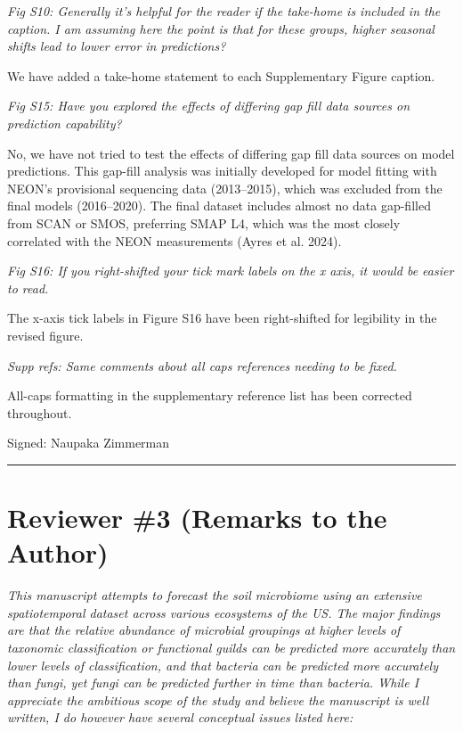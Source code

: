 \documentclass[11pt]{article}
\begin{document}
\bigskip

\textit{Fig S10: Generally it's helpful for the reader if the take-home is included in the caption. I am assuming here the point is that for these groups, higher seasonal shifts lead to lower error in predictions?}

We have added a take-home statement to each Supplementary Figure caption.

\bigskip

\textit{Fig S15: Have you explored the effects of differing gap fill data sources on prediction capability?}

No, we have not tried to test the effects of differing gap fill data sources on model predictions. This gap-fill analysis was initially developed for model fitting with NEON's provisional sequencing data (2013--2015), which was excluded from the final models (2016--2020). The final dataset includes almost no data gap-filled from SCAN or SMOS, preferring SMAP L4, which was the most closely correlated with the NEON measurements (Ayres et al. 2024).

\bigskip

\textit{Fig S16: If you right-shifted your tick mark labels on the x axis, it would be easier to read.}

The x-axis tick labels in Figure S16 have been right-shifted for legibility in the revised figure.

\bigskip

\textit{Supp refs: Same comments about all caps references needing to be fixed.}

All-caps formatting in the supplementary reference list has been corrected throughout.

\bigskip

Signed: Naupaka Zimmerman

\bigskip\hrule\bigskip

\section*{Reviewer \#3 (Remarks to the Author)}

\textit{This manuscript attempts to forecast the soil microbiome using an extensive spatiotemporal dataset across various ecosystems of the US. The major findings are that the relative abundance of microbial groupings at higher levels of taxonomic classification or functional guilds can be predicted more accurately than lower levels of classification, and that bacteria can be predicted more accurately than fungi, yet fungi can be predicted further in time than bacteria. While I appreciate the ambitious scope of the study and believe the manuscript is well written, I do however have several conceptual issues listed here:}
\end{document}
